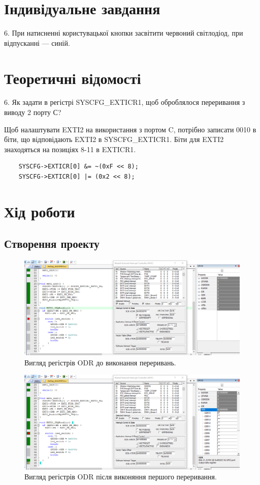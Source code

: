 \documentclass[oneside,14pt]{extarticle}
\begin{document}
\begin{normalsize}
	\section*{Індивідуальне завдання}
	6. При натисненні користувацької кнопки засвітити червоний світлодіод, при відпусканні — синій.

	\section*{Теоретичні відомості}
	6. Як задати в регістрі SYSCFG\_EXTICR1, щоб оброблялося переривання з виводу 2 порту С?
	
	Щоб налаштувати EXTI2 на використання з портом C, потрібно записати 0010 в біти, що відповідають EXTI2 в SYSCFG\_EXTICR1. Біти для EXTI2 знаходяться на позиціях 8-11 в EXTICR1.
	
	\begin{lstlisting}
	SYSCFG->EXTICR[0] &= ~(0xF << 8);
	SYSCFG->EXTICR[0] |= (0x2 << 8);	\end{lstlisting}
	
	\section*{Хід роботи}
	\subsection*{Створення проекту}
	\begin{figure}[H]
		\centering
		\includegraphics[scale=0.45]{1}
		\caption{Вигляд регістрів ODR до виконання переривань.}
	\end{figure}
	
	\begin{figure}[H]
		\centering
		\includegraphics[scale=0.45]{2}
		\caption{Вигляд регістрів ODR після виконяння першого переривання.}
	\end{figure}
	

\end{normalsize}
\end{document}
